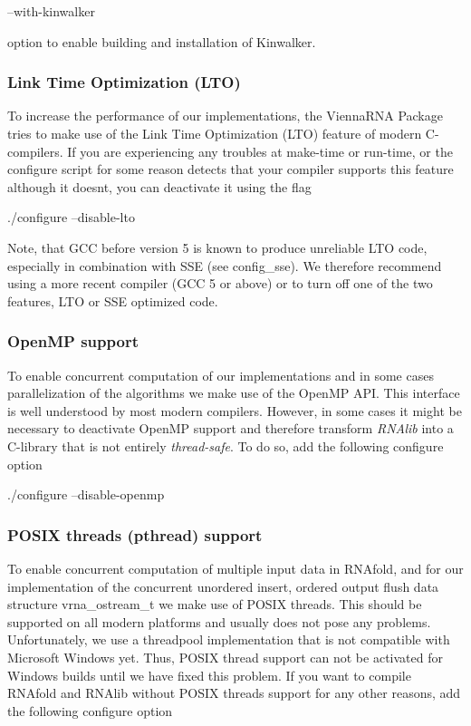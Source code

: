 \begin{DoxyVerb}--with-kinwalker
\end{DoxyVerb}


option to enable building and installation of Kinwalker.\hypertarget{install_config_lto}{}\subsubsection{Link Time Optimization (\+L\+T\+O)}\label{install_config_lto}
To increase the performance of our implementations, the Vienna\+R\+NA Package tries to make use of the Link Time Optimization (L\+TO) feature of modern C-\/compilers. If you are experiencing any troubles at make-\/time or run-\/time, or the configure script for some reason detects that your compiler supports this feature although it doesn\textquotesingle{}t, you can deactivate it using the flag

\begin{DoxyVerb}./configure --disable-lto
\end{DoxyVerb}


Note, that G\+CC before version 5 is known to produce unreliable L\+TO code, especially in combination with S\+SE (see config\+\_\+sse). We therefore recommend using a more recent compiler (G\+CC 5 or above) or to turn off one of the two features, L\+TO or S\+SE optimized code.\hypertarget{install_config_openmp}{}\subsubsection{Open\+M\+P support}\label{install_config_openmp}
To enable concurrent computation of our implementations and in some cases parallelization of the algorithms we make use of the Open\+MP A\+PI. This interface is well understood by most modern compilers. However, in some cases it might be necessary to deactivate Open\+MP support and therefore transform {\itshape R\+N\+Alib} into a C-\/library that is not entirely {\itshape thread-\/safe}. To do so, add the following configure option

\begin{DoxyVerb}./configure --disable-openmp
\end{DoxyVerb}
\hypertarget{install_config_pthread}{}\subsubsection{P\+O\+S\+I\+X threads (pthread) support}\label{install_config_pthread}
To enable concurrent computation of multiple input data in R\+N\+Afold, and for our implementation of the concurrent unordered insert, ordered output flush data structure vrna\+\_\+ostream\+\_\+t we make use of P\+O\+S\+IX threads. This should be supported on all modern platforms and usually does not pose any problems. Unfortunately, we use a threadpool implementation that is not compatible with Microsoft Windows yet. Thus, P\+O\+S\+IX thread support can not be activated for Windows builds until we have fixed this problem. If you want to compile R\+N\+Afold and R\+N\+Alib without P\+O\+S\+IX threads support for any other reasons, add the following configure option

